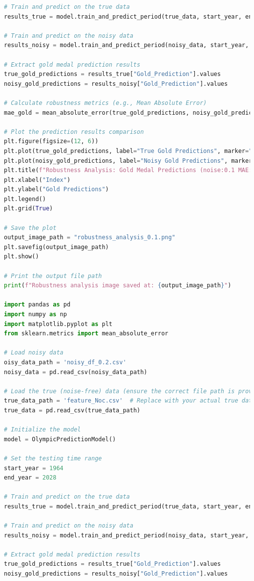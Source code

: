 \documentclass[12pt]{article}
\begin{document}
\begin{lstlisting}[language=Python, style=mystyle, caption=model.ipynb]
# Train and predict on the true data
results_true = model.train_and_predict_period(true_data, start_year, end_year)

# Train and predict on the noisy data
results_noisy = model.train_and_predict_period(noisy_data, start_year, end_year)

# Extract gold medal prediction results
true_gold_predictions = results_true["Gold_Prediction"].values
noisy_gold_predictions = results_noisy["Gold_Prediction"].values

# Calculate robustness metrics (e.g., Mean Absolute Error)
mae_gold = mean_absolute_error(true_gold_predictions, noisy_gold_predictions)

# Plot the prediction results comparison
plt.figure(figsize=(12, 6))
plt.plot(true_gold_predictions, label="True Gold Predictions", marker="o")
plt.plot(noisy_gold_predictions, label="Noisy Gold Predictions", marker="x", linestyle="--")
plt.title(f"Robustness Analysis: Gold Medal Predictions (noise:0.1 MAE: {mae_gold:.2f})")
plt.xlabel("Index")
plt.ylabel("Gold Predictions")
plt.legend()
plt.grid(True)

# Save the plot
output_image_path = "robustness_analysis_0.1.png"
plt.savefig(output_image_path)
plt.show()

# Print the output file path
print(f"Robustness analysis image saved at: {output_image_path}")

import pandas as pd
import numpy as np
import matplotlib.pyplot as plt
from sklearn.metrics import mean_absolute_error

# Load noisy data
oisy_data_path = 'noisy_df_0.2.csv'
noisy_data = pd.read_csv(noisy_data_path)

# Load the true (noise-free) data (ensure the correct file path is provided)
true_data_path = 'feature_Noc.csv'  # Replace with your actual true data path
true_data = pd.read_csv(true_data_path)

# Initialize the model
model = OlympicPredictionModel()

# Set the testing time range
start_year = 1964
end_year = 2028

# Train and predict on the true data
results_true = model.train_and_predict_period(true_data, start_year, end_year)

# Train and predict on the noisy data
results_noisy = model.train_and_predict_period(noisy_data, start_year, end_year)

# Extract gold medal prediction results
true_gold_predictions = results_true["Gold_Prediction"].values
noisy_gold_predictions = results_noisy["Gold_Prediction"].values


\end{lstlisting}
\end{document}
